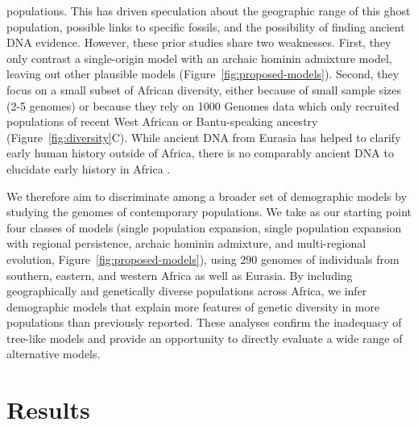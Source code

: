\documentclass[]{article}
\begin{document}
populations.
This has driven speculation about the geographic range of this ghost
population, possible links to specific fossils, and the possibility of
finding ancient DNA evidence\citep{Hsieh2016-gk}. However, these prior
studies share two weaknesses. First, they only contrast a single-origin model
with an archaic hominin admixture model, leaving out other plausible models
\citep{Henn2018-rf} (Figure~\ref{fig:proposed-models}).
Second, they
focus on a small subset of African diversity, either because of small sample
sizes (2-5 genomes) or because they rely on 1000 Genomes data which only
recruited populations of recent West African or Bantu-speaking ancestry
(Figure~\ref{fig:diversity}C). 
While ancient DNA from Eurasia has helped to clarify early human history
outside of Africa, there is no comparably ancient DNA to elucidate early history
in Africa \citep{Lipson2022-xf}.

We therefore aim to discriminate among a broader set of demographic
models by studying the genomes of contemporary populations. We take as our
starting point four classes of models (single population expansion, single
population expansion with regional persistence, archaic hominin admixture, and
multi-regional evolution, Figure~\ref{fig:proposed-models}), using 290
genomes of individuals from southern, eastern, and western Africa as well as Eurasia.
By including geographically and genetically diverse populations across Africa, we
infer demographic models that explain more features of genetic diversity
in more populations than previously reported. These analyses confirm the inadequacy of
tree-like models and provide an opportunity to directly evaluate a wide range
of alternative models. 


\section*{Results}
\end{document}
